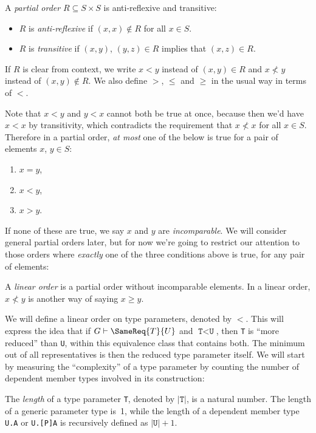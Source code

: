 \documentclass[../generics]{subfiles}
\begin{document}
\begin{definition}\label{def order}
A \emph{partial order} $R\subseteq S\times S$ is anti-reflexive and transitive:
\begin{itemize}
\item $R$ is \emph{anti-reflexive} if $(x,x)\notin R$ for all $x\in S$.
\item $R$ is \emph{transitive} if $(x,y)$, $(y,z)\in R$ implies that $(x,z)\in R$.
\end{itemize}
If $R$ is clear from context, we write $x<y$ instead of $(x,y)\in R$ and $x\not< y$ instead of $(x,y)\notin R$. We also define $>$, $\leq$ and $\geq$ in the usual way in terms of $<$.
\end{definition}
Note that $x<y$ and $y<x$ cannot both be true at once, because then we'd have $x<x$ by transitivity, which contradicts the requirement that $x\not< x$ for all $x\in S$. Therefore in a partial order, \emph{at most} one of the below is true for a pair of elements $x$, $y\in S$:
\begin{enumerate}
\item $x=y$,
\item $x<y$,
\item $x>y$.
\end{enumerate}
If none of these are true, we say $x$ and $y$ are \emph{incomparable}. We will consider general partial orders later, but for now we're going to restrict our attention to those orders where \emph{exactly} one of the three conditions above is true, for any pair of elements:
\begin{definition}
A \emph{linear order} is a partial order without incomparable elements. In a linear order, $x\not< y$ is another way of saying $x \geq y$.
\end{definition}

We will define a linear order on type parameters, denoted by $<$. This will express the idea that if $G\vdash\SameReq{T}{U}$ and $\texttt{T}<\texttt{U}$, then \texttt{T} is ``more reduced'' than \texttt{U}, within this equivalence class that contains both. The minimum out of all representatives is then the reduced type parameter itself. We will start by measuring the ``complexity'' of a type parameter by counting the number of dependent member types involved in its construction:
\begin{definition}
The \emph{length} of a type parameter \texttt{T}, denoted by $|\texttt{T}|$, is a natural number. The length of a generic parameter type is~1, while the length of a dependent member type \texttt{U.A} or \texttt{U.[P]A} is recursively defined as $|\texttt{U}|+1$.
\end{definition}
\end{document}
